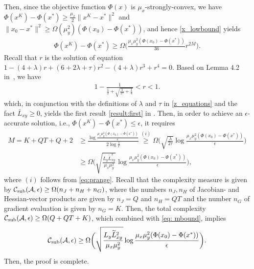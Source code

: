 \documentclass{osudissert96}
\begin{document}
 Then, since the objective function $\Phi(x)$ is $\mu_x$-strongly-convex, we have $\Phi(x^K)-\Phi(x^*)\geq \frac{\mu_x}{2}\|x^K-x^*\|^2$ and $\|x_0-x^*\|^2\geq \Omega(\mu_y^2)(\Phi(x_0)-\Phi(x^*))$, and hence \cref{x_lowbound} yields
\begin{align}
\Phi(x^K)-\Phi(x^*) \geq \Omega\Big( \frac{\mu_x\mu_y^2(\Phi(x_0)-\Phi(x^*))}{36} r^{2M}\Big). 
\end{align}
Recall that $r$ is the solution of equation $1 - (4+\lambda)r + (6+2\lambda +\tau) r^2 -(4+\lambda) r^3 +r^4=0$. Based on Lemma 4.2 in~\cite{zhang2019lower}, we have 
\begin{align}\label{eq:prange}
1-\frac{1}{\frac{1}{2}+\sqrt{\frac{\lambda}{2\tau}+\frac{1}{4}}} < r< 1. 
\end{align}
which, in conjunction with the definitions of $\lambda$ and $\tau$ in \cref{z_equations} and the fact $\bar L_{xy}\geq 0$, yields the first result \cref{result:first} in . Then, in order to achieve an $\epsilon$-accurate solution, i.e., $\Phi(x^K)-\Phi(x^*) \leq \epsilon$, it requires
\begin{align}\label{eq: mbound}
M=K+QT+Q + 2 &\geq \frac{\log  \frac{\mu_x\mu_y^2(\Phi(x_0)-\Phi(x^*))}{\epsilon} }{2\log \frac{1}{r}}  \overset{(i)} \geq \Omega\Big(\sqrt{\frac{\lambda}{2\tau}}\log  \frac{\mu_x\mu_y^2(\Phi(x_0)-\Phi(x^*))}{\epsilon} \Big) \nonumber
\\&\geq \Omega\bigg(\sqrt{\frac{L_y\widetilde L_{xy}^2}{\mu_x\mu_y^2}}\log  \frac{\mu_x\mu_y^2(\Phi(x_0)-\Phi(x^*))}{\epsilon} \bigg),
\end{align}
where $(i)$ follows from \cref{eq:prange}. 
Recall that the complexity measure is given by $\mathcal{C}_{\text{\normalfont sub}}(\mathcal{A},\epsilon) \geq \Omega(n_J+n_H + n_G)$, where the numbers $n_J,n_H$ of Jacobian- and Hessian-vector products  are given by $n_J=Q$ and $n_H=QT$ and the number $n_G$ of gradient evaluation is given by $n_G=K$. Then, the total complexity $\mathcal{C}_{\text{\normalfont sub}}(\mathcal{A},\epsilon)\geq \Omega(Q+QT+K)$, which combined with \cref{eq: mbound}, implies 
\begin{align*}
\mathcal{C}_{\text{\normalfont sub}}(\mathcal{A},\epsilon) \geq \Omega\bigg(\sqrt{\frac{L_y\widetilde L_{xy}^2}{\mu_x\mu_y^2}}\log  \frac{\mu_x\mu_y^2(\Phi(x_0)-\Phi(x^*))}{\epsilon}  \bigg).
\end{align*}
Then, the proof is complete. 
\end{document}

